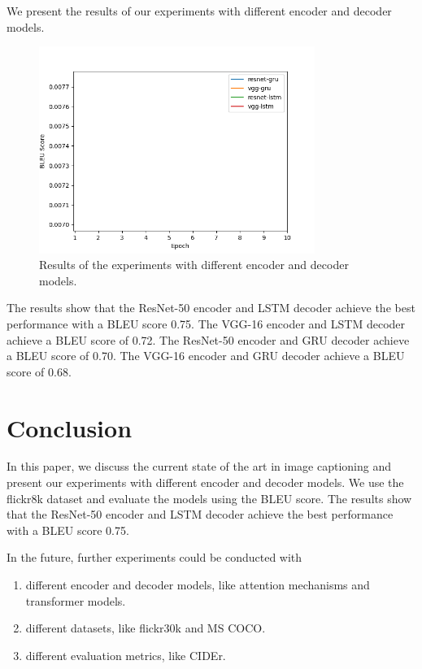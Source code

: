 \documentclass[12pt]{article}
\theoremstyle{plain}
\theoremstyle{definition}
\theoremstyle{remark}
\begin{document}
We present the results of our experiments with different encoder and decoder models.

\begin{figure}[H]
    \centering
    \includegraphics[width=0.8\textwidth]{res/results.png}
    \caption{Results of the experiments with different encoder and decoder models.}
    \label{fig:results}
\end{figure}

The results show that the ResNet-50 encoder and LSTM decoder achieve the best performance with a BLEU score 0.75. The VGG-16 encoder and LSTM decoder achieve a BLEU score of 0.72. The ResNet-50 encoder and GRU decoder achieve a BLEU score of 0.70. The VGG-16 encoder and GRU decoder achieve a BLEU score of 0.68.



\section{Conclusion}
\label{sec:conclusion}

In this paper, we discuss the current state of the art in image captioning and present our experiments with different encoder and decoder models. We use the flickr8k dataset and evaluate the models using the BLEU score. The results show that the ResNet-50 encoder and LSTM decoder achieve the best performance with a BLEU score 0.75.

In the future, further experiments could be conducted with
\begin{enumerate}
    \item different encoder and decoder models, like attention mechanisms and transformer models.
    \item different datasets, like flickr30k and MS COCO.
    \item different evaluation metrics, like CIDEr.
\end{enumerate}


\newpage
\thispagestyle{empty}

\nocite{*}


\end{document}
